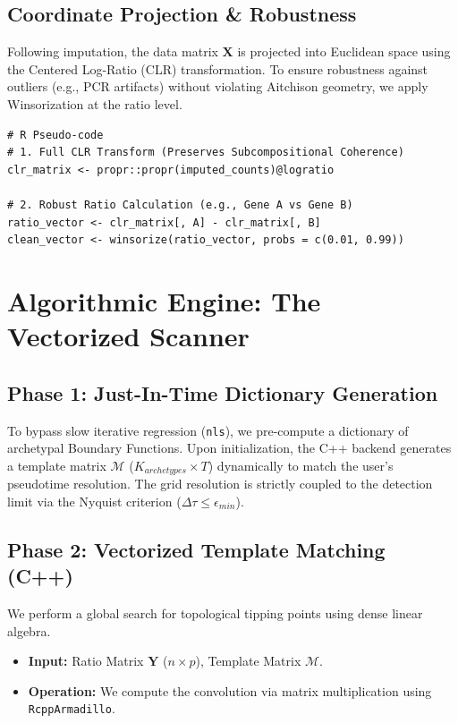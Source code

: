 \documentclass[11pt, a4paper]{article}
\begin{document}
\subsection{Coordinate Projection \& Robustness}
Following imputation, the data matrix $\mathbf{X}$ is projected into Euclidean space using the Centered Log-Ratio (CLR) transformation. To ensure robustness against outliers (e.g., PCR artifacts) without violating Aitchison geometry, we apply Winsorization at the ratio level.

\begin{lstlisting}
# R Pseudo-code
# 1. Full CLR Transform (Preserves Subcompositional Coherence)
clr_matrix <- propr::propr(imputed_counts)@logratio

# 2. Robust Ratio Calculation (e.g., Gene A vs Gene B)
ratio_vector <- clr_matrix[, A] - clr_matrix[, B]
clean_vector <- winsorize(ratio_vector, probs = c(0.01, 0.99))
\end{lstlisting}

\section{Algorithmic Engine: The Vectorized Scanner}

\subsection{Phase 1: Just-In-Time Dictionary Generation}
To bypass slow iterative regression (\texttt{nls}), we pre-compute a dictionary of archetypal Boundary Functions. Upon initialization, the C++ backend generates a template matrix $\mathcal{M}$ ($K_{archetypes} \times T$) dynamically to match the user's pseudotime resolution. The grid resolution is strictly coupled to the detection limit via the Nyquist criterion ($\Delta\tau \le \epsilon_{min}$).

\subsection{Phase 2: Vectorized Template Matching (C++)}
We perform a global search for topological tipping points using dense linear algebra.

\begin{itemize}
    \item \textbf{Input:} Ratio Matrix $\mathbf{Y}$ ($n \times p$), Template Matrix $\mathcal{M}$.
    \item \textbf{Operation:} We compute the convolution via matrix multiplication using \texttt{RcppArmadillo}.
\end{itemize}
\end{document}
